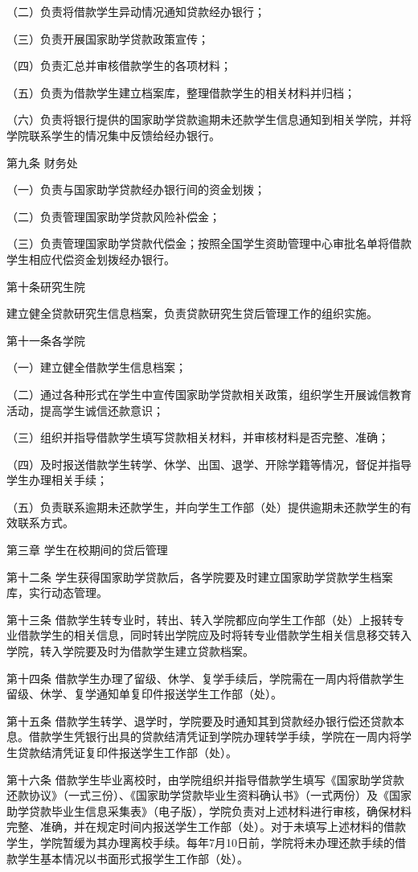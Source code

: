 \documentclass[UTF8,12pt,a4paper]{report}
\begin{document}
（二）负责将借款学生异动情况通知贷款经办银行；

（三）负责开展国家助学贷款政策宣传；

（四）负责汇总并审核借款学生的各项材料；

（五）负责为借款学生建立档案库，整理借款学生的相关材料并归档；

（六）负责将银行提供的国家助学贷款逾期未还款学生信息通知到相关学院，并将学院联系学生的情况集中反馈给经办银行。

第九条 财务处

（一）负责与国家助学贷款经办银行间的资金划拨；

（二）负责管理国家助学贷款风险补偿金；

（三）负责管理国家助学贷款代偿金；按照全国学生资助管理中心审批名单将借款学生相应代偿资金划拨经办银行。

第十条研究生院

建立健全贷款研究生信息档案，负责贷款研究生贷后管理工作的组织实施。

第十一条各学院

（一）建立健全借款学生信息档案；

（二）通过各种形式在学生中宣传国家助学贷款相关政策，组织学生开展诚信教育活动，提高学生诚信还款意识；

（三）组织并指导借款学生填写贷款相关材料，并审核材料是否完整、准确；

（四）及时报送借款学生转学、休学、出国、退学、开除学籍等情况，督促并指导学生办理相关手续；

（五）负责联系逾期未还款学生，并向学生工作部（处）提供逾期未还款学生的有效联系方式。

第三章 学生在校期间的贷后管理

第十二条 学生获得国家助学贷款后，各学院要及时建立国家助学贷款学生档案库，实行动态管理。

第十三条 借款学生转专业时，转出、转入学院都应向学生工作部（处）上报转专业借款学生的相关信息，同时转出学院应及时将转专业借款学生相关信息移交转入学院，转入学院要及时为借款学生建立贷款档案。

第十四条 借款学生办理了留级、休学、复学手续后，学院需在一周内将借款学生留级、休学、复学通知单复印件报送学生工作部（处）。

第十五条 借款学生转学、退学时，学院要及时通知其到贷款经办银行偿还贷款本息。借款学生凭银行出具的贷款结清凭证到学院办理转学手续，学院在一周内将学生贷款结清凭证复印件报送学生工作部（处）。

第十六条 借款学生毕业离校时，由学院组织并指导借款学生填写《国家助学贷款还款协议》（一式三份）、《国家助学贷款毕业生资料确认书》（一式两份）及《国家助学贷款毕业生信息采集表》（电子版），学院负责对上述材料进行审核，确保材料完整、准确，并在规定时间内报送学生工作部（处）。对于未填写上述材料的借款学生，学院暂缓为其办理离校手续。每年7月10日前，学院将未办理还款手续的借款学生基本情况以书面形式报学生工作部（处）。
\end{document}
